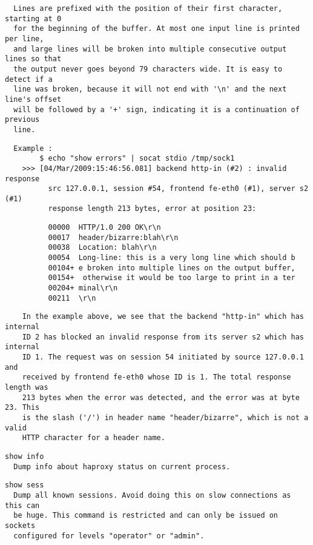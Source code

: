 \begin{verbatim}
  Lines are prefixed with the position of their first character, starting at 0
  for the beginning of the buffer. At most one input line is printed per line,
  and large lines will be broken into multiple consecutive output lines so that
  the output never goes beyond 79 characters wide. It is easy to detect if a
  line was broken, because it will not end with '\n' and the next line's offset
  will be followed by a '+' sign, indicating it is a continuation of previous
  line.
\end{verbatim}

\begin{verbatim}
  Example :
        $ echo "show errors" | socat stdio /tmp/sock1
    >>> [04/Mar/2009:15:46:56.081] backend http-in (#2) : invalid response
          src 127.0.0.1, session #54, frontend fe-eth0 (#1), server s2 (#1)
          response length 213 bytes, error at position 23:
\end{verbatim}

\begin{verbatim}
          00000  HTTP/1.0 200 OK\r\n
          00017  header/bizarre:blah\r\n
          00038  Location: blah\r\n
          00054  Long-line: this is a very long line which should b
          00104+ e broken into multiple lines on the output buffer,
          00154+  otherwise it would be too large to print in a ter
          00204+ minal\r\n
          00211  \r\n
\end{verbatim}

\begin{verbatim}
    In the example above, we see that the backend "http-in" which has internal
    ID 2 has blocked an invalid response from its server s2 which has internal
    ID 1. The request was on session 54 initiated by source 127.0.0.1 and
    received by frontend fe-eth0 whose ID is 1. The total response length was
    213 bytes when the error was detected, and the error was at byte 23. This
    is the slash ('/') in header name "header/bizarre", which is not a valid
    HTTP character for a header name.
\end{verbatim}

\begin{verbatim}
show info
  Dump info about haproxy status on current process.
\end{verbatim}

\begin{verbatim}
show sess
  Dump all known sessions. Avoid doing this on slow connections as this can
  be huge. This command is restricted and can only be issued on sockets
  configured for levels "operator" or "admin".
\end{verbatim}

